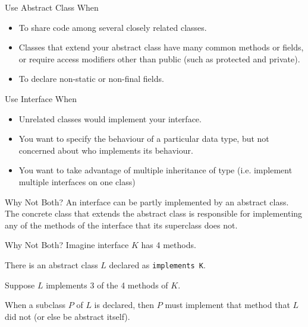 \documentclass{beamer}
\begin{document}
\begin{frame}{Use Abstract Class When}
\begin{itemize}
\item To share code among several closely related classes.
\item Classes that extend your abstract class have many common methods or fields, or require access modifiers other than public (such as protected and private).
\item To declare non-static or non-final fields. 
\end{itemize}
\end{frame}




\begin{frame}{Use Interface When}
\begin{itemize}
\item Unrelated classes would implement your interface. 
\item You want to specify the behaviour of a particular data type, but not concerned about who implements its behaviour.
\item You want to take advantage of multiple inheritance of type (i.e. implement multiple interfaces on one class)
\end{itemize}
\end{frame}




\begin{frame}{Why Not Both?}
An interface can be partly implemented by an abstract class.
The concrete class that extends the abstract class is responsible for implementing any of the methods of the interface that its superclass does not. 
\end{frame}

\begin{frame}{Why Not Both?}
Imagine interface $K$ has 4 methods. 

There is an abstract class $L$ declared as \texttt{implements K}. 

Suppose $L$ implements 3 of the 4 methods of $K$. 

When a subclass $P$ of $L$ is declared, then $P$ must implement that method that $L$ did not (or else be abstract itself).

\end{frame}
\end{document}
